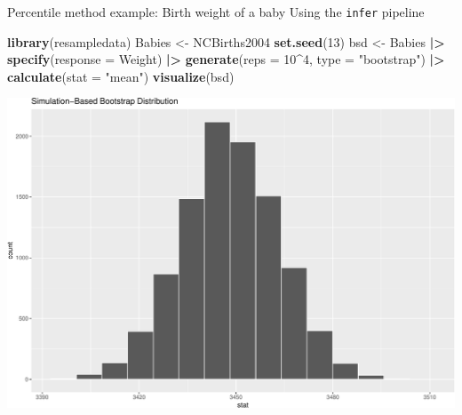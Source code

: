 \documentclass[
  ignorenonframetext,
]{beamer}
\newenvironment{Shaded}{\begin{snugshade}}{\end{snugshade}}
\newcommand{\AttributeTok}[1]{\textcolor[rgb]{0.13,0.29,0.53}{#1}}
\newcommand{\DecValTok}[1]{\textcolor[rgb]{0.00,0.00,0.81}{#1}}
\newcommand{\FunctionTok}[1]{\textcolor[rgb]{0.13,0.29,0.53}{\textbf{#1}}}
\newcommand{\NormalTok}[1]{#1}
\newcommand{\OtherTok}[1]{\textcolor[rgb]{0.56,0.35,0.01}{#1}}
\newcommand{\SpecialCharTok}[1]{\textcolor[rgb]{0.81,0.36,0.00}{\textbf{#1}}}
\newcommand{\StringTok}[1]{\textcolor[rgb]{0.31,0.60,0.02}{#1}}
\begin{document}
\begin{frame}[fragile]{Percentile method example: Birth weight of a
baby}
\protect\hypertarget{percentile-method-example-birth-weight-of-a-baby}{}
Using the \texttt{infer} pipeline

\tiny

\begin{Shaded}
\begin{Highlighting}[]
\FunctionTok{library}\NormalTok{(resampledata)}
\NormalTok{Babies }\OtherTok{\textless{}{-}}\NormalTok{ NCBirths2004}
\FunctionTok{set.seed}\NormalTok{(}\DecValTok{13}\NormalTok{)}
\NormalTok{bsd }\OtherTok{\textless{}{-}}\NormalTok{ Babies }\SpecialCharTok{|\textgreater{}} 
  \FunctionTok{specify}\NormalTok{(}\AttributeTok{response =}\NormalTok{ Weight) }\SpecialCharTok{|\textgreater{}} 
  \FunctionTok{generate}\NormalTok{(}\AttributeTok{reps =} \DecValTok{10}\SpecialCharTok{\^{}}\DecValTok{4}\NormalTok{, }\AttributeTok{type =} \StringTok{"bootstrap"}\NormalTok{) }\SpecialCharTok{|\textgreater{}} 
  \FunctionTok{calculate}\NormalTok{(}\AttributeTok{stat =} \StringTok{"mean"}\NormalTok{)}
\FunctionTok{visualize}\NormalTok{(bsd)}
\end{Highlighting}
\end{Shaded}

\begin{center}\includegraphics[width=0.7\linewidth,height=0.45\textheight]{Week10_Lect_files/figure-beamer/unnamed-chunk-19-1} \end{center}
\normalsize
\end{frame}
\end{document}
